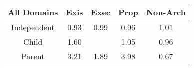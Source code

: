 \begin{tabular}{|c||c|c|c|c|}
\hline
All Domains & Exis & Exec & Prop & Non-Arch \\ 
\hline
Independent & \cellcolor[rgb]{0.8775651886895495,0.6864752264638675,0.3897275094435795} 0.93 & \cellcolor[rgb]{0.9052855651685501,0.8176850084644701,0.41559986082398004} 0.99 & \cellcolor[rgb]{0.8906934078519033,0.7486154638323427,0.4019805139951098} 0.96 & \cellcolor[rgb]{0.9090829979821891,0.839565630623142,0.42} 1.01 \\ 
\hline
Child & \cellcolor[rgb]{0.8330196703974134,0.8035356333461432,0.42} 1.60 &  & \cellcolor[rgb]{0.9036719943213366,0.8370025236258962,0.42} 1.05 & \cellcolor[rgb]{0.8913106095955318,0.7515368854188502,0.4025565689558296} 0.96 \\ 
\hline
Parent & \cellcolor[rgb]{0.6281216457753847,0.7064786743146559,0.42} 3.21 & \cellcolor[rgb]{0.7967265566313161,0.7863441584043076,0.42} 1.89 & \cellcolor[rgb]{0.53,0.66,0.42} 3.98 & \cellcolor[rgb]{0.76,0.13,0.28} 0.67 \\ 
\hline
\end{tabular}